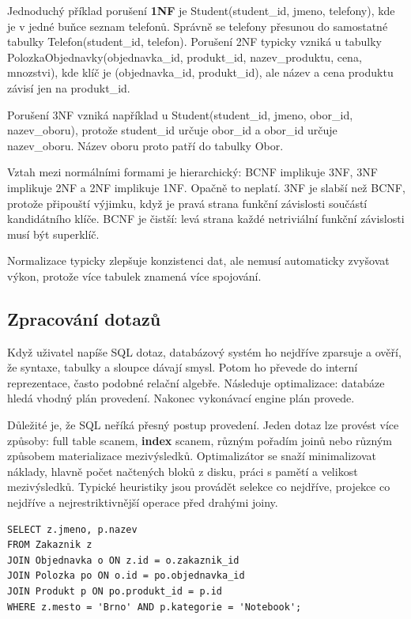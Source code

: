 \documentclass[11pt,a4paper]{article}
\begin{document}
Jednoduchý příklad porušení \textbf{1NF} je Student(student\_id, jmeno, telefony), kde je v jedné buňce seznam telefonů. Správně se telefony přesunou do samostatné tabulky Telefon(student\_id, telefon). Porušení 2NF typicky vzniká u tabulky PolozkaObjednavky(objednavka\_id, produkt\_id, nazev\_produktu, cena, mnozstvi), kde klíč je (objednavka\_id, produkt\_id), ale název a cena produktu závisí jen na produkt\_id.

Porušení 3NF vzniká například u Student(student\_id, jmeno, obor\_id, nazev\_oboru), protože student\_id určuje obor\_id a obor\_id určuje nazev\_oboru. Název oboru proto patří do tabulky Obor.

Vztah mezi normálními formami je hierarchický: BCNF implikuje 3NF, 3NF implikuje 2NF a 2NF implikuje 1NF. Opačně to neplatí. 3NF je slabší než BCNF, protože připouští výjimku, když je pravá strana funkční závislosti součástí kandidátního klíče. BCNF je čistší: levá strana každé netriviální funkční závislosti musí být superklíč.

Normalizace typicky zlepšuje konzistenci dat, ale nemusí automaticky zvyšovat výkon, protože více tabulek znamená více spojování.

\subsection*{Zpracování dotazů}

Když uživatel napíše SQL dotaz, databázový systém ho nejdříve zparsuje a ověří, že syntaxe, tabulky a sloupce dávají smysl. Potom ho převede do interní reprezentace, často podobné relační algebře. Následuje optimalizace: databáze hledá vhodný plán provedení. Nakonec vykonávací engine plán provede.

Důležité je, že SQL neříká přesný postup provedení. Jeden dotaz lze provést více způsoby: full table scanem, \textbf{index} scanem, různým pořadím joinů nebo různým způsobem materializace mezivýsledků. Optimalizátor se snaží minimalizovat náklady, hlavně počet načtených bloků z disku, práci s pamětí a velikost mezivýsledků. Typické heuristiky jsou provádět selekce co nejdříve, projekce co nejdříve a nejrestriktivnější operace před drahými joiny.

\begin{codebox}
\small
\begin{verbatim}
SELECT z.jmeno, p.nazev
FROM Zakaznik z
JOIN Objednavka o ON z.id = o.zakaznik_id
JOIN Polozka po ON o.id = po.objednavka_id
JOIN Produkt p ON po.produkt_id = p.id
WHERE z.mesto = 'Brno' AND p.kategorie = 'Notebook';
\end{verbatim}
\end{codebox}
\end{document}
